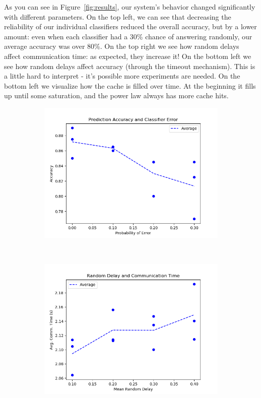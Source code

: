\documentclass[12pt]{article}
\begin{document}
As you can see in Figure~\ref{fig:results}, our system's behavior changed significantly with different parameters.
On the top left, we can see that decreasing the reliability of our individual classifiers reduced the overall accuracy, but by a lower amount: 
    even when each classifier had a 30\% chance of answering randomly, our average accuracy was over 80\%.
On the top right we see how random delays affect communication time: as expected, they increase it!
On the bottom left we see how random delays affect accuracy (through the timeout mechanism).
This is a little hard to interpret - it's possible more experiments are needed.
On the bottom left we visualize how the cache is filled over time.
At the beginning it fills up until some saturation, and the power law always has more cache hits.

\begin{figure}
    \centering
    \begin{subfigure}{0.35\textwidth}
        \includegraphics[width=\textwidth]{plot_1_final.png}
    \end{subfigure}
    ~
    \begin{subfigure}{0.35\textwidth}
        \includegraphics[width=\textwidth]{plot_3_final.png}

\end{subfigure}
\end{figure}
\end{document}
